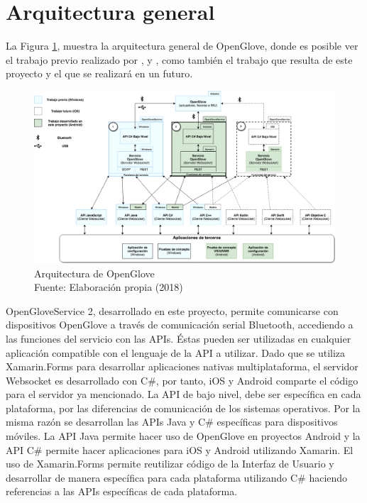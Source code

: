 \section{Arquitectura general}

La Figura \ref{fig:arquitectura-open-glove}, muestra la arquitectura general de OpenGlove, donde es posible ver el trabajo previo realizado por \cite{tesis-monsalve-rodrigo}, \cite{tesis-meneses-sebastian} y \cite{tesis-cerda-rodrigo}, como también el trabajo que resulta de este proyecto y el que se realizará en un futuro.

\begin{figure}[H]
  \begin{center} 
   	\includegraphics[width=1.0\textwidth]{images/chapter04/OpenGlove-Architecture-General.png} 
    \caption[Arquitectura de Openglove]{Arquitectura de OpenGlove \\Fuente: Elaboración propia (2018)}
    \label{fig:arquitectura-open-glove}
  \end{center}
\end{figure}

OpenGloveService 2, desarrollado en este proyecto, permite comunicarse con dispositivos OpenGlove a través de comunicación serial Bluetooth, accediendo a las funciones del servicio con las APIs. Éstas pueden ser utilizadas en cualquier aplicación compatible con el lenguaje de la API a utilizar. Dado que se utiliza Xamarin.Forms para desarrollar aplicaciones nativas multiplataforma, el servidor Websocket es desarrollado con C\#, por tanto, iOS y Android comparte el código para el servidor ya mencionado. La API de bajo nivel, debe ser específica en cada plataforma, por las diferencias de comunicación de los sistemas operativos. Por la misma razón se desarrollan las APIs Java y C\# específicas para dispositivos móviles. La API Java permite hacer uso de OpenGlove en proyectos Android y la API C\# permite hacer aplicaciones para iOS y Android utilizando Xamarin. El uso de Xamarin.Forms permite reutilizar código de la Interfaz de Usuario y desarrollar de manera específica para cada plataforma utilizando C\# haciendo referencias a las APIs específicas de cada plataforma.

